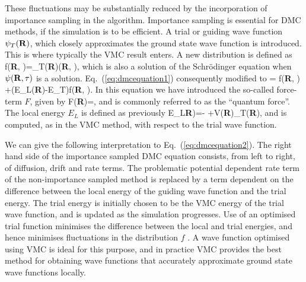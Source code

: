 These fluctuations may be substantially reduced by the incorporation 
of importance sampling in the
algorithm. 
Importance sampling is essential for DMC methods, 
if the simulation is to be efficient. 
A trial or guiding wave function $\psi_T({\bf R})$, which closely
approximates the ground state wave function is introduced.
This is where typically the VMC result enters.
A new distribution is defined as 
\be
   f({\bf R}, \tau)=\psi_T({\bf R})\psi({\bf R}, \tau),
\ee
which is also a solution of the Schr\"odinger equation when  
$\psi({\bf R}, \tau)$ 
is a solution. 
Eq.~(\ref{eq:dmcequation1}) consequently modified to
\be
   =
    \nabla{}f({\bf R}, \tau)
    +(E_L({\bf R})-E_T)f({\bf R}, \tau).
    \label{eq:dmcequation2}
\ee
In this equation we have introduced the so-called force-term $F$,
given by
\be
   F({\bf R})=,
\ee
and is commonly referred to as the ``quantum force''. 
The local energy $E_L$ is defined as previously
\be
    E_L{\bf R})=-
                +V({\bf R})\psi_T({\bf R}),
\ee
and is computed, as in the VMC method, with respect to the trial wave function.

We can give the following interpretation to Eq.~(\ref{eq:dmcequation2}).
The right hand side of the importance sampled DMC equation
consists, from left to right, of diffusion, drift and rate terms. The
problematic potential dependent rate term of the non-importance 
sampled method is replaced by a term dependent on the difference 
between the local
energy of the guiding wave function and the trial energy. 
The trial energy is initially chosen to be the VMC energy of 
the trial  wave function, and is
updated as the simulation progresses. Use of an optimised 
trial function minimises the difference between the local 
and trial energies, and hence
minimises fluctuations in the distribution $f$ . 
A wave function optimised using VMC is ideal for this purpose, 
and in practice VMC provides the best
method for obtaining wave functions that accurately 
approximate ground state wave functions locally. 


